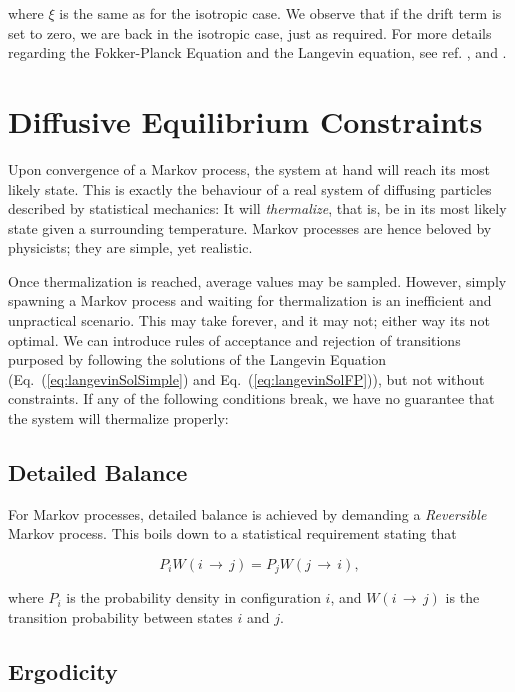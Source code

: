 where $\xi$ is the same as for the isotropic case. We observe that if the drift term is set to zero, we are back in the isotropic case, just as required. For more details regarding the Fokker-Planck Equation and the Langevin equation, see ref. \cite{Gardiner:2004bk}, \cite{risken1989fpe} and \cite{langevin}.


\section{Diffusive Equilibrium Constraints}

Upon convergence of a Markov process, the system at hand will reach its most likely state. This is exactly the behaviour of a real system of diffusing particles described by statistical mechanics: It will \textit{thermalize}, that is, be in its most likely state given a surrounding temperature. Markov processes are hence beloved by physicists; they are simple, yet realistic. 

Once thermalization is reached, average values may be sampled. However, simply spawning a Markov process and waiting for thermalization is an inefficient and unpractical scenario. This may take forever, and it may not; either way its not optimal. We can introduce rules of acceptance and rejection of transitions purposed by following the solutions of the Langevin Equation (Eq.~(\ref{eq:langevinSolSimple}) and Eq.~(\ref{eq:langevinSolFP})), but not without constraints. If any of the following conditions break, we have no guarantee that the system will thermalize properly:

\subsection{Detailed Balance} 

For Markov processes, detailed balance is achieved by demanding a \textit{Reversible} Markov process. This boils down to a statistical requirement stating that 

\begin{equation}
 \label{eq:DetailedBalance}
 P_iW(i\,\rightarrow\,j) = P_jW(j\,\rightarrow\,i),
\end{equation}

where $P_i$ is the probability density in configuration $i$, and $W(i\,\rightarrow\,j)$ is the transition probability between states $i$ and $j$. 

\subsection{Ergodicity}

